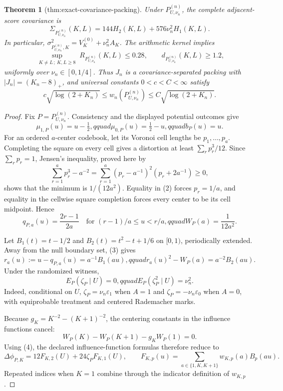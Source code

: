 \documentclass{article}
\newtheorem{theorem}{Theorem}
\begin{document}
\begin{theorem}[thm:exact-covariance-packing]\label{thm:exact-covariance-packing}
Under \(P_{U,\nu_n}^{(n)}\), the complete adjacent-score covariance is \[\Sigma_{P_{U,\nu_n}^{(n)}}(K,L)=144H_2(K,L)+576\nu_n^2H_1(K,L).\] In particular, \(\sigma_{P_{U,\nu_n}^{(n)},K}^2=V_K^{(0)}+\nu_n^2A_K\). The arithmetic kernel implies \[\sup_{\substack{K\ne L\,;\ K,L\ge8}}R_{P_{U,\nu_n}^{(n)}}(K,L)\le0.28,\qquad d_{P_{U,\nu_n}^{(n)}}(K,L)\ge1.2,\] uniformly over \(\nu_n\in[0,1/4]\). Thus \(J_n\) is a covariance-separated packing with \(|J_n|=(K_n-8)_+\), and universal constants \(0<c<C<\infty\) satisfy \[c\sqrt{\log(2+K_n)}\le w_n(P_{U,\nu_n}^{(n)})\le C\sqrt{\log(2+K_n)}.\]
\end{theorem}
\begin{proof}
Fix \(P=P_{U,\nu_n}^{(n)}\).  Consistency and the displayed potential outcomes give
\[
 \mu_{1,P}(u)=u-\tfrac12,qquad \mu_{0,P}(u)=\tfrac12-u,qquad b_P(u)=u.          \tag{1}
\]
For an ordered \(a\)-center codebook, let its Voronoi cell lengths be \(p_1,\ldots,p_a\).  Completing the square on every cell gives a distortion at least \(\sum_rp_r^3/12\).  Since \(\sum_rp_r=1\), Jensen's inequality, proved here by
\[
 \sum_{r=1}^a p_r^3-a^{-2}
 =\sum_{r=1}^a(p_r-a^{-1})^2(p_r+2a^{-1})\geq0,                                \tag{2}
\]
shows that the minimum is \(1/(12a^2)\).  Equality in (2) forces \(p_r=1/a\), and equality in the cellwise square completion forces every center to be its cell midpoint.  Hence
\[
 q_{P,a}(u)=\frac{2r-1}{2a}\quad\text{for }(r-1)/a\leq u<r/a,qquad
 W_P(a)=\frac1{12a^2}.                                                            \tag{3}
\]

Let \(B_1(t)=t-1/2\) and \(B_2(t)=t^2-t+1/6\) on \([0,1)\), periodically extended.  Away from the null boundary set, (3) gives
\[
 r_a(u):=u-q_{P,a}(u)=a^{-1}B_1(au),qquad
 r_a(u)^2-W_P(a)=a^{-2}B_2(au).                                                   \tag{4}
\]
Under the randomized witness,
\[
 E_P(\zeta_P\mid U)=0,qquad E_P(\zeta_P^2\mid U)=\nu_n^2.                     \tag{5}
\]
Indeed, conditional on \(U\), \(\zeta_P=\nu_n\varepsilon_1\) when \(A=1\) and \(\zeta_P=-\nu_n\varepsilon_0\) when \(A=0\), with equiprobable treatment and centered Rademacher marks.

Because \(g_K=K^{-2}-(K+1)^{-2}\), the centering constants in the influence functions cancel:
\[
 W_P(K)-W_P(K+1)-g_KW_P(1)=0.
\]
Using (4), the declared influence-function formulas therefore reduce to
\[
 \Delta\phi_{P,K}=12F_{K,2}(U)+24\zeta_PF_{K,1}(U),
 \qquad F_{K,p}(u)=\sum_{a\in\{1,K,K+1\}}w_{K,p}(a)B_p(au).                    \tag{6}
\]
Repeated indices when \(K=1\) combine through the indicator definition of \(w_{K,p}\).


\end{proof}
\end{document}
